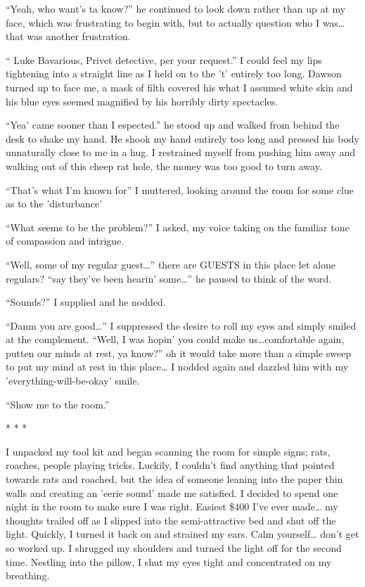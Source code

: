 ``Yeah, who want's ta know?'' he continued to look down
rather than up at my face, which was frustrating to begin with, but
to actually question who I was{\ldots} that was another
frustration.

`` Luke Bavarious, Privet detective, per your request.''
I could feel my lips tightening into a straight line as I held on
to the 't' entirely too long. Dawson turned up to face me, a mask
of filth covered his what I assumed white skin and his blue eyes
seemed magnified by his horribly dirty spectacles.

``Yea' came sooner than I espected.'' he stood up and
walked from behind the desk to shake my hand. He shook my hand
entirely too long and pressed his body unnaturally close to me in a
hug. I restrained myself from pushing him away and walking out of
this cheep rat hole, the money was too good to turn away.

``That's what I'm known for'' I muttered, looking around
the room for some clue as to the 'disturbance'

``What seems to be the problem?'' I asked, my voice
taking on the familiar tone of compassion and intrigue.

``Well, some of my regular guest{\ldots}'' there are GUESTS in
this place let alone regulars? ``say they've been hearin'
some{\ldots}'' he paused to think of the word.

``Sounds?'' I supplied and he nodded.

``Damn you are good{\ldots}'' I suppressed the desire to roll
my eyes and simply smiled at the complement. ``Well, I was
hopin' you could make us{\ldots}comfortable again, putten our minds at
rest, ya know?'' oh it would take more than a simple sweep to
put my mind at rest in this place{\ldots} I nodded again and dazzled him
with my 'everything-will-be-okay' smile.

``Show me to the room.''

* * *

I unpacked my tool kit and began scanning the room for simple
signs; rats, roaches, people playing tricks. Luckily, I couldn't
find anything that pointed towards rats and roached, but the idea
of someone leaning into the paper thin walls and creating an 'eerie
sound' made me satisfied. I decided to spend one night in the room
to make sure I was right. Easiest \$400 I've ever made{\ldots} my
thoughts trailed off as I slipped into the semi-attractive bed and
shut off the light. Quickly, I turned it back on and strained my
ears. Calm yourself{\ldots} don't get so worked up. I shrugged my
shoulders and turned the light off for the second time. Nestling
into the pillow, I shut my eyes tight and concentrated on my
breathing.

